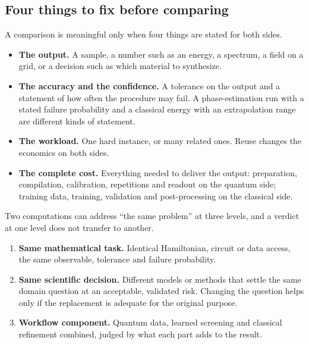 \documentclass[10pt,a4paper]{article}
\begin{document}
\subsection{Four things to fix before comparing}
A comparison is meaningful only when four things are stated for both sides.
\begin{itemize}
\item \textbf{The output.} A sample, a number such as an energy, a spectrum, a field on a grid, or a decision such as which material to synthesize.
\item \textbf{The accuracy and the confidence.} A tolerance on the output and a statement of how often the procedure may fail. A phase-estimation run with a stated failure probability and a classical energy with an extrapolation range are different kinds of statement.
\item \textbf{The workload.} One hard instance, or many related ones. Reuse changes the economics on both sides.
\item \textbf{The complete cost.} Everything needed to deliver the output: preparation, compilation, calibration, repetitions and readout on the quantum side; training data, training, validation and post-processing on the classical side.
\end{itemize}

Two computations can address ``the same problem'' at three levels, and a verdict at one level does not transfer to another.
\begin{enumerate}
\item \textbf{Same mathematical task.} Identical Hamiltonian, circuit or data access, the same observable, tolerance and failure probability.
\item \textbf{Same scientific decision.} Different models or methods that settle the same domain question at an acceptable, validated risk. Changing the question helps only if the replacement is adequate for the original purpose.
\item \textbf{Workflow component.} Quantum data, learned screening and classical refinement combined, judged by what each part adds to the result.
\end{enumerate}
\end{document}

